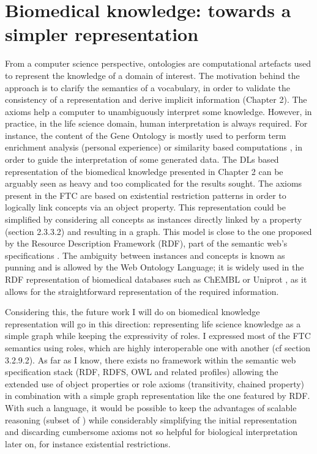 \section{Biomedical knowledge: towards a simpler representation}
From a computer science perspective, ontologies are computational artefacts used to represent the knowledge of a domain of interest. The motivation behind the approach is to clarify the semantics of a vocabulary, in order to validate the consistency of a representation and derive implicit information (Chapter 2). The axioms help a computer to unambiguously interpret some knowledge. However, in practice, in the life science domain, human interpretation is always required. For instance, the content of the Gene Ontology is mostly used to perform term enrichment analysis (personal experience) or similarity based computations \citep{pesquita2009semantic}, in order to guide the interpretation of some generated data. The DLs based representation of the biomedical knowledge presented in Chapter 2 can be arguably seen as heavy and too complicated for the results sought. The axioms present in the FTC are based on existential restriction patterns in order to logically link concepts via an object property. This representation could be simplified by considering all concepts as instances directly linked by a property (section 2.3.3.2) and resulting in a graph. This model is close to the one proposed by the Resource Description Framework (RDF), part of the semantic web’s specifications \citep{klyne2006resource}. The ambiguity between instances and concepts is known as punning and is allowed by the Web Ontology Language; it is widely used in the RDF representation of biomedical databases such as ChEMBL or Uniprot \citep{jupp2014ebi}, as it allows for the straightforward representation of the required information.

Considering this, the future work I will do on biomedical knowledge representation will go in this direction: representing life science knowledge as a simple graph while keeping the expressivity of roles. I expressed most of the FTC semantics using roles, which are highly interoperable one with another (cf section 3.2.9.2). As far as I know, there exists no framework within the semantic web specification stack (RDF, RDFS, OWL and related profiles) allowing the extended use of object properties or role axioms (transitivity, chained property) in combination with a simple graph representation like the one featured by RDF. With such a language, it would be possible to keep the advantages of scalable reasoning (subset of ) while considerably simplifying the initial representation and discarding cumbersome axioms not so helpful for biological interpretation later on, for instance existential restrictions.


